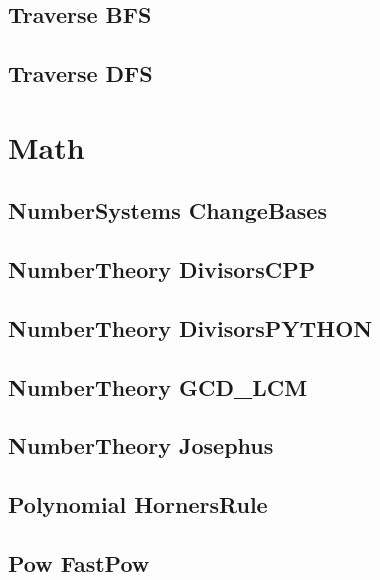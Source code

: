 \subsection{Traverse BFS}
\raggedbottom
\hrulefill
\subsection{Traverse DFS}
\raggedbottom
\hrulefill

\section{Math}
\subsection{NumberSystems ChangeBases}
\raggedbottom
\hrulefill
\subsection{NumberTheory DivisorsCPP}
\raggedbottom
\hrulefill
\subsection{NumberTheory DivisorsPYTHON}
\raggedbottom
\hrulefill
\subsection{NumberTheory GCD_LCM}
\raggedbottom
\hrulefill
\subsection{NumberTheory Josephus}
\raggedbottom
\hrulefill
\subsection{Polynomial HornersRule}
\raggedbottom
\hrulefill
\subsection{Pow FastPow}
\raggedbottom
\hrulefill

